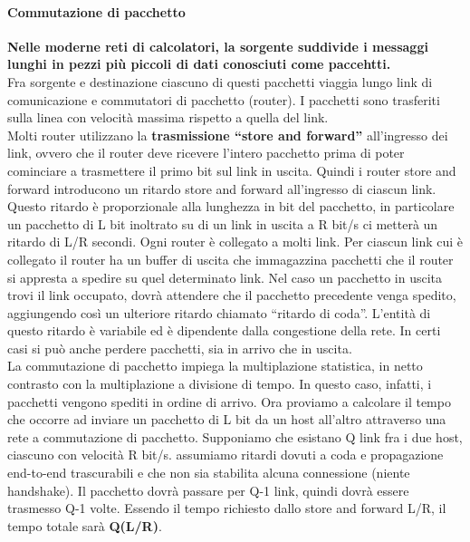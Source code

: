 \documentclass[11pt,a4paper]{book}
\begin{document}
\paragraph{Commutazione di pacchetto}
\textbf{Nelle moderne reti di calcolatori, la sorgente suddivide i messaggi lunghi in pezzi più piccoli di dati conosciuti come paccehtti.} \\
Fra sorgente e destinazione ciascuno di questi pacchetti viaggia lungo link di comunicazione e commutatori di pacchetto (router). I pacchetti sono trasferiti sulla linea con velocità massima rispetto a quella del link. \\
Molti router utilizzano la \textbf{trasmissione “store and forward”} all’ingresso dei link, ovvero che il router deve ricevere l’intero pacchetto prima di poter cominciare a trasmettere il primo bit sul link in uscita. Quindi i router store and forward introducono un ritardo store and forward all’ingresso di ciascun link. Questo ritardo è proporzionale alla lunghezza in bit del pacchetto, in particolare un pacchetto di L bit inoltrato su di un link in uscita a R bit/s ci metterà un ritardo di L/R secondi.
Ogni router è collegato a molti link. Per ciascun link cui è collegato il router ha un buffer di uscita che immagazzina pacchetti che il router si appresta a spedire su quel determinato link. Nel caso un pacchetto in uscita trovi il link occupato, dovrà attendere che il pacchetto precedente venga spedito, aggiungendo così un ulteriore ritardo chiamato “ritardo di coda”. L’entità di questo ritardo è variabile ed è dipendente dalla congestione della rete. In certi casi si può anche perdere pacchetti, sia in arrivo che in uscita. \\
La commutazione di pacchetto impiega la multiplazione statistica, in netto contrasto con la multiplazione a divisione di tempo. In questo caso, infatti, i pacchetti vengono spediti in ordine di arrivo.
Ora proviamo a calcolare il tempo che occorre ad inviare un pacchetto di L bit da un host all’altro attraverso una rete a commutazione di pacchetto. Supponiamo che esistano Q link fra i due host, ciascuno con velocità R bit/s. assumiamo ritardi dovuti a coda e propagazione end-to-end trascurabili e che non sia stabilita alcuna connessione (niente handshake). Il pacchetto dovrà passare per Q-1 link, quindi dovrà essere trasmesso Q-1 volte. Essendo il tempo richiesto dallo store and forward L/R, il tempo totale sarà \textbf{Q(L/R)}.
\end{document}
